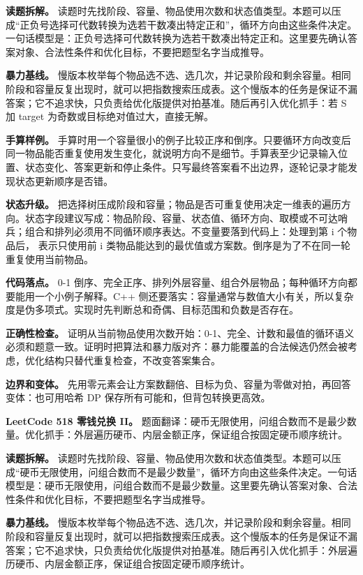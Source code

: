 \textbf{读题拆解。} 读题时先找阶段、容量、物品使用次数和状态值类型。本题可以压成“正负号选择可代数转换为选若干数凑出特定正和”，循环方向由这些条件决定。一句话模型是：正负号选择可代数转换为选若干数凑出特定正和。这里要先确认答案对象、合法性条件和优化目标，不要把题型名字当成推导。

\textbf{暴力基线。} 慢版本枚举每个物品选不选、选几次，并记录阶段和剩余容量。相同阶段和容量反复出现时，就可以把指数搜索压成表。这个慢版本的任务是保证不漏答案；它不追求快，只负责给优化版提供对拍基准。随后再引入优化抓手：若 S 加 target 为奇数或目标绝对值过大，直接无解。

\textbf{手算样例。} 手算时用一个容量很小的例子比较正序和倒序。只要循环方向改变后同一物品能否重复使用发生变化，就说明方向不是细节。手算表至少记录输入位置、状态变化、答案更新和停止条件。只写最终答案看不出边界，逐轮记录才能发现状态更新顺序是否错。

\textbf{状态升级。} 把选择树压成阶段和容量；物品是否可重复使用决定一维表的遍历方向。状态字段建议写成：物品阶段、容量、状态值、循环方向、取模或不可达哨兵；组合和排列必须用不同循环顺序表达。不变量要落到代码上：处理到第 i 个物品后， 表示只使用前 i 类物品能达到的最优值或方案数。倒序是为了不在同一轮重复使用当前物品。

\textbf{代码落点。} 0-1 倒序、完全正序、排列外层容量、组合外层物品；每种循环方向都要能用一个小例子解释。C++ 侧还要落实：容量通常与数值大小有关，所以复杂度是伪多项式。实现时先判断总和奇偶、目标范围和负数是否存在。

\textbf{正确性检查。} 证明从当前物品使用次数开始：0-1、完全、计数和最值的循环语义必须和题意一致。证明时把算法和暴力版对齐：暴力能覆盖的合法候选仍然会被考虑，优化结构只替代重复检查，不改变答案集合。

\textbf{边界和变体。} 先用零元素会让方案数翻倍、目标为负、容量为零做对拍，再回答变体：也可用哈希 DP 保存所有可能和，但背包转换更高效。

\noindent\textbf{LeetCode 518 零钱兑换 II。} 题面翻译：硬币无限使用，问组合数而不是最少数量。优化抓手：外层遍历硬币、内层金额正序，保证组合按固定硬币顺序统计。

\textbf{读题拆解。} 读题时先找阶段、容量、物品使用次数和状态值类型。本题可以压成“硬币无限使用，问组合数而不是最少数量”，循环方向由这些条件决定。一句话模型是：硬币无限使用，问组合数而不是最少数量。这里要先确认答案对象、合法性条件和优化目标，不要把题型名字当成推导。

\textbf{暴力基线。} 慢版本枚举每个物品选不选、选几次，并记录阶段和剩余容量。相同阶段和容量反复出现时，就可以把指数搜索压成表。这个慢版本的任务是保证不漏答案；它不追求快，只负责给优化版提供对拍基准。随后再引入优化抓手：外层遍历硬币、内层金额正序，保证组合按固定硬币顺序统计。

